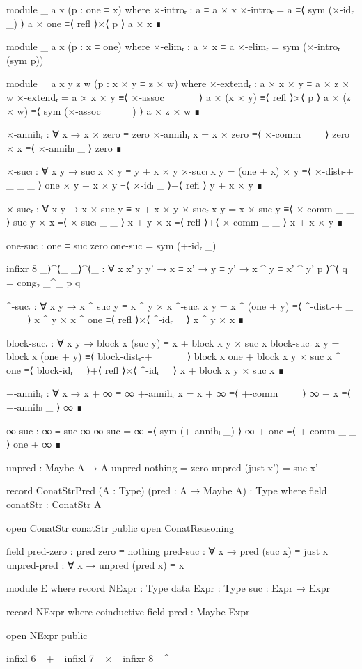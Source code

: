 \begin{code}[hide]
    module _ {a x} (p : one ≡ x) where
      ×-introᵣ : a ≡ a × x
      ×-introᵣ =
        a       ≡⟨ sym (×-idᵣ _) ⟩
        a × one ≡⟨ refl ⟩×⟨ p ⟩
        a × x   ∎

    module _ {a x} (p : x ≡ one) where
      ×-elimᵣ : a × x ≡ a
      ×-elimᵣ = sym (×-introᵣ (sym p))

    module _ {a x y z w} (p : x × y ≡ z × w) where
      ×-extendᵣ : a × x × y ≡ a × z × w
      ×-extendᵣ =
        a × x × y   ≡⟨ ×-assoc _ _ _ ⟩
        a × (x × y) ≡⟨ refl ⟩×⟨ p ⟩
        a × (z × w) ≡⟨ sym (×-assoc _ _ _) ⟩
        a × z × w   ∎

    ×-annihᵣ : ∀ x → x × zero ≡ zero
    ×-annihᵣ x =
      x × zero ≡⟨ ×-comm _ _ ⟩
      zero × x ≡⟨ ×-annihₗ _ ⟩
      zero     ∎

    ×-sucₗ : ∀ x y → suc x × y ≡ y + x × y
    ×-sucₗ x y =
      (one + x) × y   ≡⟨ ×-distₗ-+ _ _ _ ⟩
      one × y + x × y ≡⟨ ×-idₗ _ ⟩+⟨ refl ⟩
      y + x × y       ∎

    ×-sucᵣ : ∀ x y → x × suc y ≡ x + x × y
    ×-sucᵣ x y =
      x × suc y ≡⟨ ×-comm _ _ ⟩
      suc y × x ≡⟨ ×-sucₗ _ _ ⟩
      x + y × x ≡⟨ refl ⟩+⟨ ×-comm _ _ ⟩
      x + x × y ∎

    one-suc : one ≡ suc zero
    one-suc = sym (+-idᵣ _)

    infixr 8 _⟩^⟨_
    _⟩^⟨_ : ∀ {x x' y y'} → x ≡ x' → y ≡ y' → x ^ y ≡ x' ^ y'
    p ⟩^⟨ q = cong₂ _^_ p q

    ^-sucᵣ : ∀ x y → x ^ suc y ≡ x ^ y × x
    ^-sucᵣ x y =
      x ^ (one + y)   ≡⟨ ^-distᵣ-+ _ _ _ ⟩
      x ^ y × x ^ one ≡⟨ refl ⟩×⟨ ^-idᵣ _ ⟩
      x ^ y × x       ∎

    block-sucᵣ : ∀ x y → block x (suc y) ≡ x + block x y × suc x
    block-sucᵣ x y =
      block x (one + y)                     ≡⟨ block-distᵣ-+ _ _ _ ⟩
      block x one + block x y × suc x ^ one ≡⟨ block-idᵣ _ ⟩+⟨ refl ⟩×⟨ ^-idᵣ _ ⟩
      x + block x y × suc x                 ∎

    +-annihᵣ : ∀ x → x + ∞ ≡ ∞
    +-annihᵣ x =
      x + ∞ ≡⟨ +-comm _ _ ⟩
      ∞ + x ≡⟨ +-annihₗ _ ⟩
      ∞     ∎

    ∞-suc : ∞ ≡ suc ∞
    ∞-suc =
      ∞       ≡⟨ sym (+-annihₗ _) ⟩
      ∞ + one ≡⟨ +-comm _ _ ⟩
      one + ∞ ∎

    unpred : Maybe A → A
    unpred nothing = zero
    unpred (just x') = suc x'

record ConatStrPred (A : Type) (pred : A → Maybe A) : Type where
  field
    conatStr : ConatStr A

  open ConatStr conatStr public
  open ConatReasoning

  field
    pred-zero : pred zero ≡ nothing
    pred-suc : ∀ x → pred (suc x) ≡ just x
    unpred-pred : ∀ x → unpred (pred x) ≡ x

module E where
  record NExpr : Type
  data Expr : Type
  suc : Expr → Expr

  record NExpr where
    coinductive
    field pred : Maybe Expr

  open NExpr public

  infixl 6 _+_
  infixl 7 _×_
  infixr 8 _^_
\end{code}
